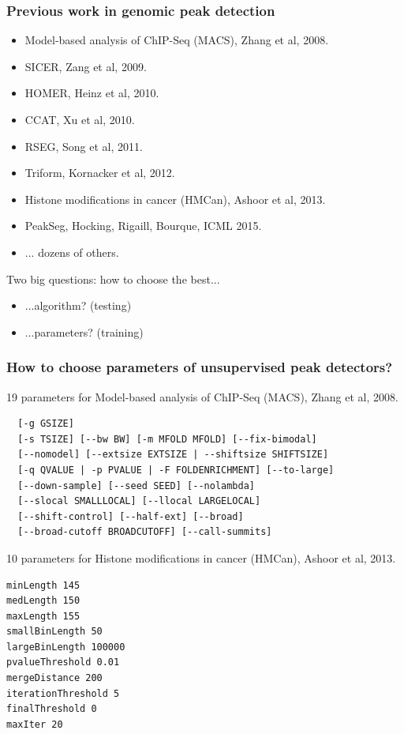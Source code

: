 \documentclass{beamer}
\begin{document}
\begin{frame}
  \frametitle{Previous work in genomic peak detection}
  \begin{itemize}
  \item Model-based analysis of ChIP-Seq (MACS), Zhang et al, 2008.
  \item SICER, Zang et al, 2009.
  \item HOMER, Heinz et al, 2010.
  \item CCAT, Xu et al, 2010.
  \item RSEG, Song et al, 2011.
  \item Triform, Kornacker et al, 2012.
  \item Histone modifications in cancer (HMCan), Ashoor et al, 2013.
  \item PeakSeg, Hocking, Rigaill, Bourque, ICML 2015.
  \item ... dozens of others.
  \end{itemize}
  Two big questions: how to choose the best...
  \begin{itemize}
  \item ...algorithm? (testing)
  \item \alert<1>{...parameters? (training)}
  \end{itemize}
\end{frame}

\begin{frame}[fragile]
  \frametitle{How to choose parameters of unsupervised peak
    detectors?}
\scriptsize
19 parameters for Model-based analysis of ChIP-Seq (MACS), Zhang et al, 2008.
\begin{verbatim}
  [-g GSIZE]
  [-s TSIZE] [--bw BW] [-m MFOLD MFOLD] [--fix-bimodal]
  [--nomodel] [--extsize EXTSIZE | --shiftsize SHIFTSIZE]
  [-q QVALUE | -p PVALUE | -F FOLDENRICHMENT] [--to-large]
  [--down-sample] [--seed SEED] [--nolambda]
  [--slocal SMALLLOCAL] [--llocal LARGELOCAL]
  [--shift-control] [--half-ext] [--broad]
  [--broad-cutoff BROADCUTOFF] [--call-summits]
\end{verbatim}
10 parameters for Histone modifications in cancer (HMCan),
Ashoor et al, 2013.
\begin{verbatim}
minLength 145
medLength 150
maxLength 155
smallBinLength 50
largeBinLength 100000
pvalueThreshold 0.01
mergeDistance 200
iterationThreshold 5
finalThreshold 0
maxIter 20
\end{verbatim}
\end{frame}
\end{document}
